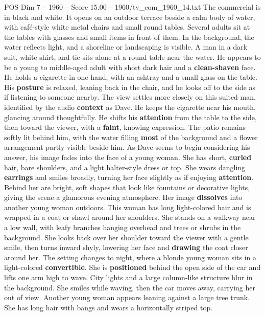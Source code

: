 \begin{textsample}{POS Dim 7 – 1960 – Score 15.00 – 1960/tv\_com\_1960\_14.txt}  \label{ex:f7_pos_022}
The commercial is in black and white.
It opens on an outdoor terrace beside a calm body of water, with café-style white metal chairs and small round tables.
Several adults sit at the tables with glasses and small items in front of them.
In the background, the water reflects light, and a shoreline or landscaping is visible.
A man in a dark suit, white shirt, and tie sits alone at a round table near the water.
He appears to be a young to middle-aged adult with short dark hair and a \textbf{clean-shaven} face.
He holds a cigarette in one hand, with an ashtray and a small glass on the table.
His \textbf{posture} is relaxed, leaning back in the chair, and he looks off to the side as if listening to someone nearby.
The view settles more closely on this suited man, identified by the audio \textbf{context} as Dave.
He keeps the cigarette near his mouth, glancing around thoughtfully.
He shifts his \textbf{attention} from the table to the side, then toward the viewer, with a \textbf{faint}, knowing expression.
The patio remains softly lit behind him, with the water filling \textbf{most} of the background and a flower arrangement partly visible beside him.
As Dave seems to begin considering his answer, his image fades into the face of a young woman.
She has short, \textbf{curled} hair, bare shoulders, and a light halter-style dress or top.
She wears dangling \textbf{earrings} and smiles broadly, turning her face slightly as if enjoying \textbf{attention}.
Behind her are bright, soft shapes that look like fountains or decorative lights, giving the scene a glamorous evening atmosphere.
Her image \textbf{dissolves} into another young woman outdoors.
This woman has long light-colored hair and is wrapped in a coat or shawl around her shoulders.
She stands on a walkway near a low wall, with leafy branches hanging overhead and trees or shrubs in the background.
She looks back over her shoulder toward the viewer with a gentle smile, then turns inward shyly, lowering her face and \textbf{drawing} the coat closer around her.
The setting changes to night, where a blonde young woman sits in a light-colored \textbf{convertible}.
She is \textbf{positioned} behind the open side of the car and lifts one arm high to wave.
City lights and a large column-like structure blur in the background.
She smiles while waving, then the car moves away, carrying her out of view.
Another young woman appears leaning against a large tree trunk.
She has long hair with bangs and wears a horizontally striped top.

\end{textsample}
